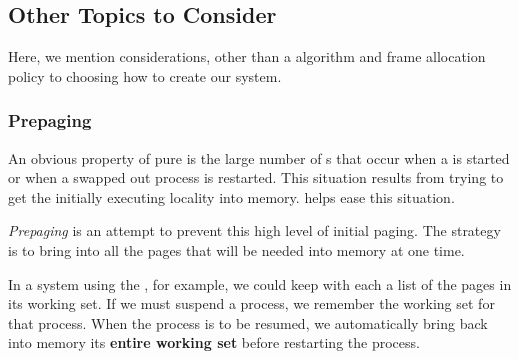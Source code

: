 \subsection{Other Topics to Consider}\label{subsec:Other_Topics_to_Consider}
Here, we mention considerations, other than a  algorithm and frame allocation policy to choosing how to create our  system.

\subsubsection{Prepaging}\label{subsubsec:Prepaging}
An obvious property of pure  is the large number of s that occur when a  is started or when a swapped out process is restarted.
This situation results from trying to get the initially executing locality into memory.
 helps ease this situation.

\begin{definition}[Prepaging]\label{def:Prepaging}
  \emph{Prepaging} is an attempt to prevent this high level of initial paging.
  The strategy is to bring into all the pages that will be needed into memory at one time.
\end{definition}

In a system using the , for example, we could keep with each  a list of the pages in its working set.
If we must suspend a process, we remember the working set for that process.
When the process is to be resumed, we automatically bring back into memory its \textbf{entire working set} before restarting the process.


